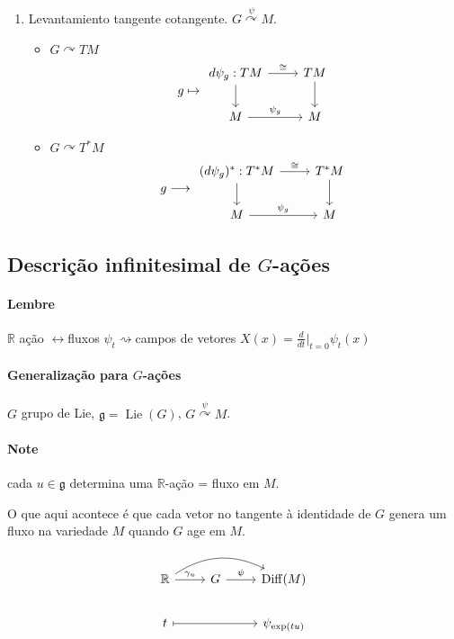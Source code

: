 \begin{example}
\begin{enumerate}
\begin{itemize}
		\end{itemize}
		\item Levantamiento tangente cotangente. $G\overset{\psi}{\curvearrowright }M$.
			\begin{itemize}
			\item $G\curvearrowright TM$
				\[g\mapsto \begin{tikzcd}d\psi_g:TM\arrow[r,"\cong "]\arrow[d]& TM\arrow[d]\\ M \arrow[r,"\psi_g"]&M\end{tikzcd}\]

			\item $G\curvearrowright T^*M$
				\[g \longrightarrow \begin{tikzcd}(d\psi_g)^* :T^* M\arrow[r,"\cong "]\arrow[d]& T^* M\arrow[d]\\ M\arrow[r,"\psi_g"]&M\end{tikzcd}\]
			\end{itemize}

	\end{enumerate}
\subsection{Descrição infinitesimal de $G$-ações}

\paragraph{Lembre} $\mathbb{R}$ ação  $\longleftrightarrow $fluxos $\psi_t\rightsquigarrow $campos de vetores $X(x)=\frac{d}{dt}\Big|_{t=0}\psi_t(x)$

\paragraph{Generalização para $G$-ações} $G$ grupo de Lie, $\mathfrak{g} =\operatorname{Lie}(G)$, $G\overset{\psi}{\curvearrowright }M$.

\paragraph{Note}  cada $u\in\mathfrak{g}$ determina uma $\mathbb{R}$-ação = fluxo em $M$.

O que aqui acontece é que cada vetor no tangente à identidade de $G$ genera um fluxo na variedade $M$ quando $G$ age em $M$.

\[\begin{tikzcd}
	\mathbb{R}\arrow[r,"\gamma_u"]\arrow[rr, bend left]& G\arrow[r,"\psi"]&\operatorname{Diff}(M) \\
	t \arrow[rr,maps to]&&\psi_{\operatorname{exp}(tu)}
\end{tikzcd}\]


\end{example}
